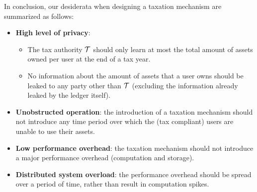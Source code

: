 In conclusion, our desiderata when designing a taxation mechanism are
summarized as follows:
\begin{itemize}
    \item \textbf{High level of privacy}:
        \begin{itemize}
            \item The tax authority $\mathcal{T}$ should only learn at most the
                total amount of assets owned per user at the end of a tax year.
            \item No information about the amount of assets that a user owns
                should be leaked to any party other than $\mathcal{T}$ (excluding
                the information already leaked by the ledger itself).
        \end{itemize}
    \item \textbf{Unobstructed operation}: the introduction of a taxation
        mechanism should not introduce any time period over which the (tax
        compliant) users are unable to use their assets.
    \item \textbf{Low performance overhead}: the taxation mechanism should not
        introduce a major performance overhead (\ie computation and storage).
    \item \textbf{Distributed system overload}: the performance overhead should
        be spread over a period of time, rather than result in computation
        spikes.
\end{itemize}
